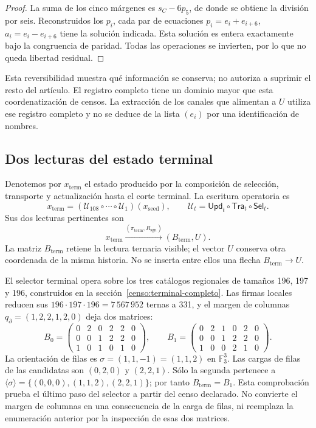\begin{proof}
La suma de los cinco márgenes es \(s_C-6p_5\), de donde se obtiene la
división por seis. Reconstruidos los \(p_i\), cada par de ecuaciones
\(p_i=e_i+e_{i+6}\), \(a_i=e_i-e_{i+6}\) tiene la solución indicada.
Esta solución es entera exactamente bajo la congruencia de paridad. Todas
las operaciones se invierten, por lo que no queda libertad residual.
\end{proof}

Esta reversibilidad muestra qué información se conserva; no autoriza a
suprimir el resto del artículo. El registro completo tiene un dominio mayor
que esta coordenatización de censos. La extracción de los canales que alimentan a
\(U\) utiliza ese registro completo y no se deduce de la lista
\((e_i)\) por una identificación de nombres.




\subsection{Dos lecturas del estado terminal}
\label{subsec:k-terminal}

Denotemos por \(x_{\mathrm{term}}\) el estado producido por la composición
de selección, transporte y actualización hasta el corte terminal. La
escritura operatoria es
\[
 x_{\mathrm{term}}=
 (\mathcal U_{108}\circ\cdots\circ\mathcal U_1)(x_{\mathrm{seed}}),
 \qquad \mathcal U_t=\mathsf{Upd}_t\circ\mathsf{Tra}_t\circ\mathsf{Sel}_t.
\]
Sus dos lecturas pertinentes son
\[
 x_{\mathrm{term}}
 \xrightarrow{(\pi_{\mathrm{term}},R_{\mathrm{sgn}})}
 (B_{\mathrm{term}},U).
\]
La matriz \(B_{\mathrm{term}}\) retiene la lectura ternaria visible; el
vector \(U\) conserva otra coordenada de la misma historia. No se inserta
entre ellos una flecha \(B_{\mathrm{term}}\to U\).

El selector terminal opera sobre los tres catálogos regionales
de tamaños 196, 197 y 196, construidos en la
sección~\ref{censo:terminal-completo}. Las firmas locales reducen sus
\(196\cdot197\cdot196=7\,567\,952\) ternas a 331, y el margen de
columnas \(q_{\partial}=(1,2,2,1,2,0)\) deja dos matrices:
\[
 B_0=\begin{pmatrix}0&2&0&2&2&0\\0&0&1&2&2&0\\1&0&1&0&1&0\end{pmatrix},
 \qquad
 B_1=\begin{pmatrix}0&2&1&0&2&0\\0&0&1&2&2&0\\1&0&0&2&1&0\end{pmatrix}.
\]
La orientación de filas es \(\sigma=(1,1,-1)=(1,1,2)\) en
\(\mathbb F_3^3\). Las cargas de filas de las candidatas son
\((0,2,0)\) y \((2,2,1)\). Sólo la segunda pertenece a
\(\langle\sigma\rangle=\{(0,0,0),(1,1,2),(2,2,1)\}\); por tanto
\(B_{\mathrm{term}}=B_1\). Esta comprobación prueba el último paso del
selector a partir del censo declarado. No convierte el margen de columnas
en una consecuencia de la carga de filas, ni reemplaza la enumeración
anterior por la inspección de esas dos matrices.

